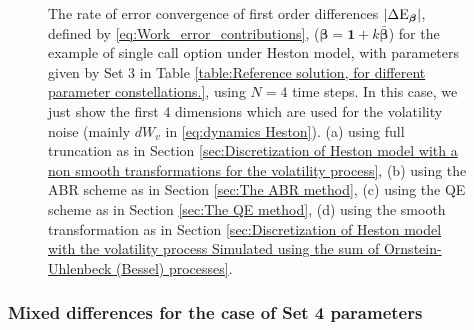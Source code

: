 \begin{figure}[htb]
	\caption{The rate of error convergence of first order differences $\left\lvert\Delta \text{E}_{\boldsymbol{\beta}}\right\rvert$, defined by \eqref{eq:Work_error_contributions}, ($\boldsymbol{\beta}=\mathbf{1}+k \bar{\boldsymbol{\beta}}$) for the example of single call option under Heston model, with parameters given by Set $3$ in Table \ref{table:Reference solution, for different parameter constellations.}, using $N=4$ time steps. In this case, we just show  the first  $4$ dimensions which are used for the volatility noise (mainly $dW_v$ in \eqref{eq:dynamics Heston}). (a) using full truncation as in Section \ref{sec:Discretization of Heston model with a non smooth transformations for the volatility process}, (b) using the ABR scheme as in Section \ref{sec:The ABR method}, (c) using the QE scheme as in Section \ref{sec:The QE method}, (d) using the smooth transformation as in Section \ref{sec:Discretization of Heston model with the volatility process Simulated using the sum of  Ornstein-Uhlenbeck (Bessel) processes}.}
	\label{fig:first_diff_Heston_call_N_4_set4}	
\end{figure}
\FloatBarrier
  
\subsubsection*{Mixed differences for the case of Set 4 parameters}

